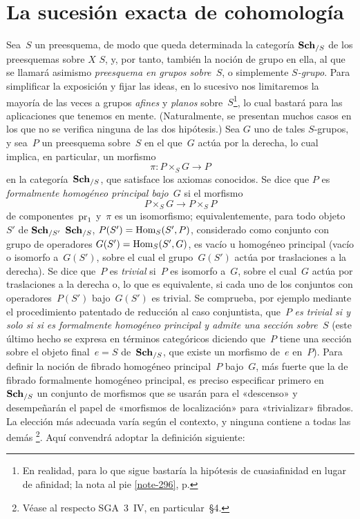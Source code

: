 
\section{La sucesión exacta de cohomología}
\label{XI.4}

Sea~$S$ un preesquema, de modo que queda determinada la categoría
$\mathbf{Sch}_{/S}$ de los preesquemas sobre
{$X$}
{$S$},
y, por tanto, también la noción de grupo en ella, al que se llamará asimismo
\emph{preesquema en grupos sobre~$S$}, o simplemente \emph{$S$-grupo}.
Para simplificar la exposición y fijar las ideas, en lo sucesivo nos
limitaremos la mayoría de las veces a grupos \emph{afines} y \emph{planos}
sobre~$S$\kern1pt\footnote{En realidad, para lo que sigue bastaría la
hipótesis de cuasiafinidad en lugar de afinidad; \cf la nota al pie
\eqref{note-296}, p\ptbl\pageref{note-296}.}, lo cual bastará para las
aplicaciones que tenemos en mente. (Naturalmente, se presentan muchos casos
en los que no se verifica ninguna de las dos hipótesis.) Sea
$G$ uno de tales $S$-grupos, y sea~$P$ un preesquema sobre~$S$ en el que~$G$
actúa por la derecha, lo cual implica, en particular, un morfismo
$$
\pi:P\times_SG\to P
$$
en la categoría~$\mathbf{Sch}_{/S}$, que satisface los axiomas conocidos. Se dice que
$P$ es \emph{formalmente homogéneo principal bajo}~$G$ si el morfismo
$$
P\times_S G\to P\times_S P
$$
de componentes~$\mathrm{pr}_1$ y~$\pi$ es un isomorfismo; equivalentemente, para todo
objeto~$S'$ de
{$\mathbf{Sch}_{/S'}$}
{$\mathbf{Sch}_{/S}$},
$P(S')=\operatorname{Hom}_S(S',P)$, considerado como conjunto con grupo de operadores
$G(S')=\operatorname{Hom}_S(S',G)$, es vacío u homogéneo principal (\ie vacío o isomorfo
a~$G(S')$, sobre el cual el grupo~$G(S')$ actúa por traslaciones a la
derecha). Se dice que~$P$ es \emph{trivial} si~$P$ es isomorfo a~$G$, sobre
el cual~$G$ actúa por traslaciones a la derecha o, lo que es equivalente, si
cada uno de los conjuntos con operadores~$P(S')$ bajo~$G(S')$ es trivial.
Se comprueba, por ejemplo mediante el procedimiento patentado de reducción al
caso conjuntista, que~$P$ \emph{es trivial si y solo
{si}
{si}
es formalmente homogéneo principal y admite una sección sobre~$S$} (este
último hecho se expresa en términos categóricos diciendo que~$P$ tiene una
sección sobre el objeto final~$e=S$ de~$\mathbf{Sch}_{/S}$, \ie que existe un
morfismo de~$e$ en~$P$). Para definir la noción de fibrado homogéneo
principal~$P$ bajo~$G$, más fuerte que la de fibrado formalmente homogéneo
principal, es preciso especificar primero en~$\mathbf{Sch}_{/S}$ un conjunto de
morfismos que se usarán para el «descenso» y desempeñarán el papel de
«morfismos de localización» para «trivializar» fibrados. La elección más
adecuada varía según el contexto, y ninguna contiene a todas las demás%
\footnote{\label{note-293}Véase al respecto SGA~3~IV, en particular~\S 4.}.
Aquí convendrá adoptar la definición siguiente:

